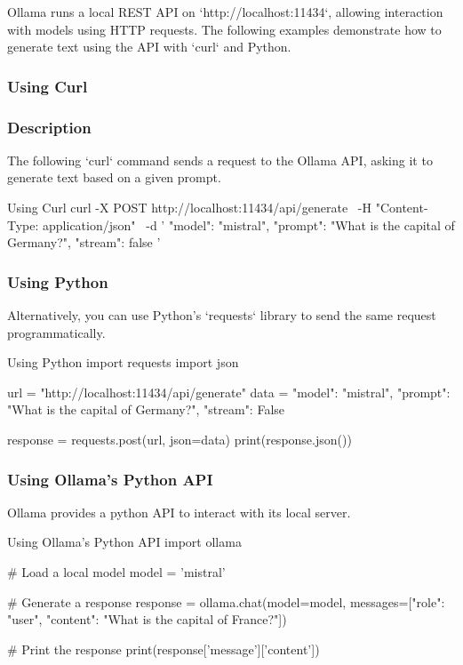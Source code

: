 Ollama runs a local REST API on `http://localhost:11434`, allowing interaction with models using HTTP requests. The following examples demonstrate how to generate text using the API with `curl` and Python.

\subsubsection{Using Curl}

\subsubsection{Description}

The following `curl` command sends a request to the Ollama API, asking it to generate text based on a given prompt.

\begin{codeonly}{Using Curl}
curl -X POST http://localhost:11434/api/generate \
-H "Content-Type: application/json" \
-d '{
  "model": "mistral",
  "prompt": "What is the capital of Germany?",
  "stream": false
}'
\end{codeonly}

\subsubsection{Using Python}

Alternatively, you can use Python’s `requests` library to send the same request programmatically.

\begin{codeonly}{Using Python}
import requests
import json

url = "http://localhost:11434/api/generate"
data = {
    "model": "mistral",
    "prompt": "What is the capital of Germany?",
    "stream": False
}

response = requests.post(url, json=data)
print(response.json())
\end{codeonly}


\subsubsection{Using Ollama's Python API}

Ollama provides a python API to interact with its local server. 

\begin{codeonly}{Using Ollama's Python API}
import ollama

# Load a local model
model = 'mistral'

# Generate a response
response = ollama.chat(model=model, messages=[{"role": "user", "content": "What is the capital of France?"}])

# Print the response
print(response['message']['content'])
\end{codeonly}


